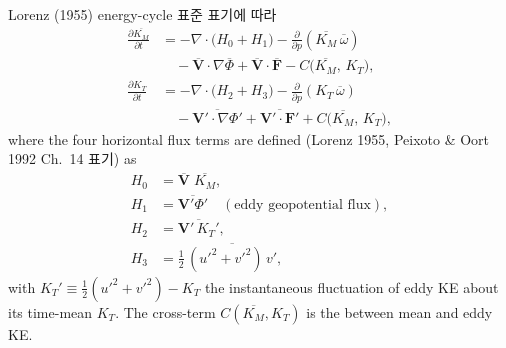 \begin{theorem}\label{thm:ch06_te_KE_budget}
Lorenz (1955) energy-cycle 표준 표기에 따라
\begin{align}
  \frac{\partial \overline{K_M}}{\partial t}
    &= -\nabla\!\cdot\!\bigl(H_0 + H_1\bigr)
       - \frac{\partial}{\partial p}\!\left(\overline{K_M}\,\overline{\omega}\right)
       \nonumber\\
    &\quad
       - \overline{\mathbf{V}}\cdot\nabla\overline{\Phi}
       + \overline{\mathbf{V}}\cdot\overline{\mathbf{F}}
       - C\!\bigl(\overline{K_M},\,K_T\bigr),
       \label{eq:ch06_te_KM_eq}\\[4pt]
  \frac{\partial K_T}{\partial t}
    &= -\nabla\!\cdot\!\bigl(H_2 + H_3\bigr)
       - \frac{\partial}{\partial p}\!\left(K_T\,\overline{\omega}\right)
       \nonumber\\
    &\quad
       - \overline{\mathbf{V}'\!\cdot\nabla\Phi'}
       + \overline{\mathbf{V}'\!\cdot\mathbf{F}'}
       + C\!\bigl(\overline{K_M},\,K_T\bigr),
       \label{eq:ch06_te_KT_eq}
\end{align}
where the four horizontal flux terms are defined (Lorenz 1955,
Peixoto \& Oort 1992 Ch.~14 표기) as
\begin{align}
  H_0 &= \overline{\mathbf{V}}\;\overline{K_M},
    \label{eq:ch06_te_H0}\\
  H_1 &= \overline{\mathbf{V}'\Phi'}
       \quad(\text{eddy geopotential flux}),
    \label{eq:ch06_te_H1}\\
  H_2 &= \overline{\mathbf{V}'\,K_T'},
    \label{eq:ch06_te_H2}\\
  H_3 &= \tfrac{1}{2}\,\overline{(u'^2 + v'^2)\,v'},
    \label{eq:ch06_te_H3}
\end{align}
with $K_T' \equiv \tfrac{1}{2}(u'^2 + v'^2) - K_T$ the instantaneous fluctuation
of eddy KE about its time-mean $K_T$.  The cross-term $C(\overline{K_M},K_T)$
is the  between mean and eddy KE.
\end{theorem}

